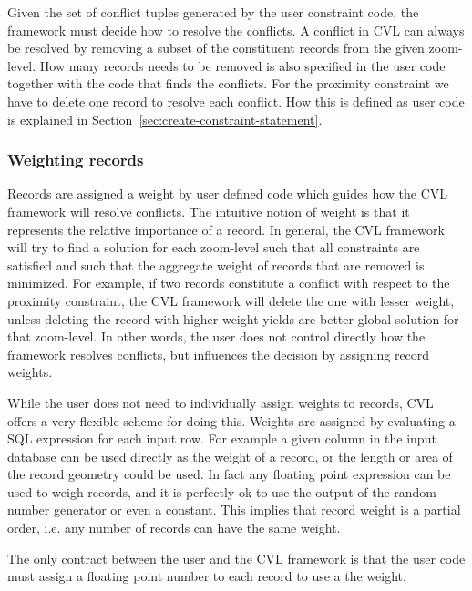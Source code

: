 Given the set of conflict tuples generated by the user constraint code, the framework must decide how to resolve the conflicts. A conflict in CVL can always be resolved by removing a subset of the constituent records from the given zoom-level. How many records needs to be removed is also specified in the user code together with the code that finds the conflicts. For the proximity constraint we have to delete one record to resolve each conflict. How this is defined as user code is explained in Section~\ref{sec:create-constraint-statement}.


\subsubsection{Weighting records}
Records are assigned a weight by user defined code which guides how the CVL framework will resolve conflicts.  The intuitive notion of weight is that it represents the relative importance of a record. In general, the CVL framework will try to find a solution for each zoom-level such that all constraints are  satisfied and such that the aggregate weight of records that are removed is minimized. For example, if two records constitute a conflict with respect to the proximity constraint, the CVL framework will delete the one with lesser weight, unless deleting the record with higher weight yields are better global solution for that zoom-level. In other words, the user does not control directly how the framework resolves conflicts, but influences the decision by assigning record weights. 

While the user does not need to individually assign weights to records, CVL offers a very flexible scheme for doing this. Weights are assigned by evaluating a SQL expression for each input row. For example a given column in the input database can be used directly as the weight of a record, or the length or area of the record geometry could be used. In fact any floating point expression can be used to weigh records, and it is perfectly ok to use the output of the random number generator or even a constant. This implies that record weight is a partial order, i.e. any number of records can have the same weight.

The only contract between the user and the CVL framework is that the user code must assign a floating point number to each record to use a the weight.


